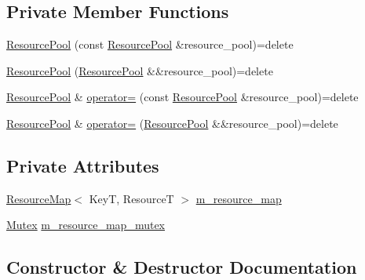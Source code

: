 \subsection*{Private Member Functions}
\begin{DoxyCompactItemize}
\item 
\hyperlink{classmage_1_1_resource_pool_a82253c9c4adfc120a813dfe811dd5e91}{Resource\+Pool} (const \hyperlink{classmage_1_1_resource_pool}{Resource\+Pool} \&resource\+\_\+pool)=delete
\item 
\hyperlink{classmage_1_1_resource_pool_a4ab8e492c60297ca2435aced3b95053a}{Resource\+Pool} (\hyperlink{classmage_1_1_resource_pool}{Resource\+Pool} \&\&resource\+\_\+pool)=delete
\item 
\hyperlink{classmage_1_1_resource_pool}{Resource\+Pool} \& \hyperlink{classmage_1_1_resource_pool_ae8121e031efe9f98605e478b01b19d33}{operator=} (const \hyperlink{classmage_1_1_resource_pool}{Resource\+Pool} \&resource\+\_\+pool)=delete
\item 
\hyperlink{classmage_1_1_resource_pool}{Resource\+Pool} \& \hyperlink{classmage_1_1_resource_pool_a1c0c196460508108435c227c11a65b94}{operator=} (\hyperlink{classmage_1_1_resource_pool}{Resource\+Pool} \&\&resource\+\_\+pool)=delete
\end{DoxyCompactItemize}
\subsection*{Private Attributes}
\begin{DoxyCompactItemize}
\item 
\hyperlink{namespacemage_a0b0a087ad59dd4aa0b4b538d8caec216}{Resource\+Map}$<$ KeyT, ResourceT $>$ \hyperlink{classmage_1_1_resource_pool_aecc46ecca2a54ef2816137276b1d73cd}{m\+\_\+resource\+\_\+map}
\item 
\hyperlink{classmage_1_1_mutex}{Mutex} \hyperlink{classmage_1_1_resource_pool_a5857b70ac755db750dcaff5277201f9f}{m\+\_\+resource\+\_\+map\+\_\+mutex}
\end{DoxyCompactItemize}


\subsection{Constructor \& Destructor Documentation}
\hypertarget{classmage_1_1_resource_pool_a94aff142869744ed48fb1b426face48b}{}\label{classmage_1_1_resource_pool_a94aff142869744ed48fb1b426face48b} 
